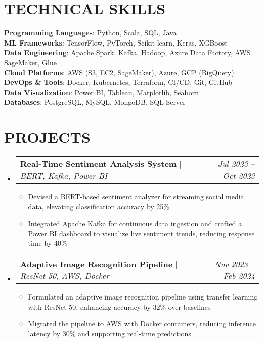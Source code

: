 \documentclass[letterpaper,11pt]{article}
\makeatletter
\newcommand{\resumeItem}[1]{
  \item\small{
    {#1 \vspace{-4pt}}
  }
}
\newcommand{\resumeProjectHeading}[2]{
    \item
    \begin{tabular*}{0.97\textwidth}{l@{\extracolsep{\fill}}r}
      \small#1 & #2 \\
    \end{tabular*}\vspace{-7pt}
}
\newcommand{\resumeSubHeadingListStart}{\begin{itemize}[leftmargin=0.15in, label={}]}
\newcommand{\resumeSubHeadingListEnd}{\end{itemize}}
\newcommand{\resumeItemListStart}{\begin{itemize}}
\newcommand{\resumeItemListEnd}{\end{itemize}\vspace{-5pt}}
\makeatother
\begin{document}
\section{\textbf{TECHNICAL SKILLS}}
 \begin{itemize}[leftmargin=0.15in, label={}]
    \small{\item{
     \textbf{Programming Languages}{: Python, Scala, SQL, Java} \\
     \textbf{ML Frameworks}{: TensorFlow, PyTorch, Scikit-learn, Keras, XGBoost} \\
     \textbf{Data Engineering}{: Apache Spark, Kafka, Hadoop, Azure Data Factory, AWS SageMaker, Glue} \\
     \textbf{Cloud Platforms}{: AWS (S3, EC2, SageMaker), Azure, GCP (BigQuery)} \\
     \textbf{DevOps \& Tools}{: Docker, Kubernetes, Terraform, CI/CD, Git, GitHub} \\
     \textbf{Data Visualization}{: Power BI, Tableau, Matplotlib, Seaborn} \\
     \textbf{Databases}{: PostgreSQL, MySQL, MongoDB, SQL Server} \\
    }}
 \end{itemize}

\section{\textbf{PROJECTS}}
  \resumeSubHeadingListStart
  
    \resumeProjectHeading
        {\textbf{Real-Time Sentiment Analysis System} $|$ \emph{BERT, Kafka, Power BI}}{\textit{Jul 2023 – Oct 2023}}
        \resumeItemListStart
          \resumeItem{Devised a BERT-based sentiment analyzer for streaming social media data, elevating classification accuracy by 25\%}
          \resumeItem{Integrated Apache Kafka for continuous data ingestion and crafted a Power BI dashboard to visualize live sentiment trends, reducing response time by 40\%}
        \resumeItemListEnd
        
    \resumeProjectHeading
        {\textbf{Adaptive Image Recognition Pipeline} $|$ \emph{ResNet-50, AWS, Docker}}{\textit{Nov 2023 – Feb 2024}}
        \resumeItemListStart
          \resumeItem{Formulated an adaptive image recognition pipeline using transfer learning with ResNet-50, enhancing accuracy by 32\% over baselines}
          \resumeItem{Migrated the pipeline to AWS with Docker containers, reducing inference latency by 30\% and supporting real-time predictions}
        \resumeItemListEnd

  \resumeSubHeadingListEnd
\end{document}
